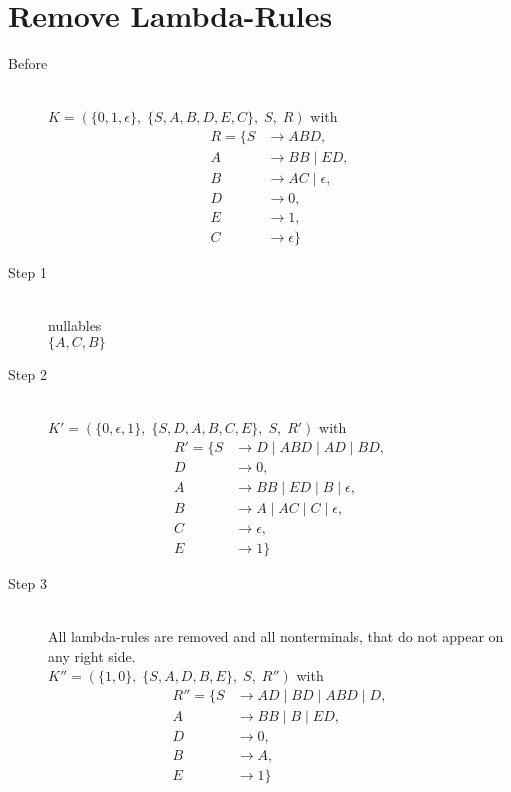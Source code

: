 \documentclass{article}
\begin{document}
\section{Remove Lambda-Rules}

\begin{description}
	\item[Before] \hfill \\ 
		$K=\left(\{	0, 1, \epsilon\},\;\{ S, A, B, D, E, C\},\;S,\;R\right)$ with
	\begin{align*}
		R=\{	S &\rightarrow ABD, \\ 
		A &\rightarrow BB\;|\;ED, \\ 
		B &\rightarrow AC\;|\;\epsilon, \\ 
		D &\rightarrow 0, \\ 
		E &\rightarrow 1, \\ 
		C &\rightarrow \epsilon\}
	\end{align*}
	\item[Step 1] \hfill \\ 
	nullables\\ 
	$\{	A, 	C, 	B\}$
	\item[Step 2] \hfill \\ 
		$K'=\left(\{	0, \epsilon, 1\},\;\{ S, D, A, B, C, E\},\;S,\;R'\right)$ with
	\begin{align*}
		R'=\{	S &\rightarrow D\;|\;ABD\;|\;AD\;|\;BD, \\ 
		D &\rightarrow 0, \\ 
		A &\rightarrow BB\;|\;ED\;|\;B\;|\;\epsilon, \\ 
		B &\rightarrow A\;|\;AC\;|\;C\;|\;\epsilon, \\ 
		C &\rightarrow \epsilon, \\ 
		E &\rightarrow 1\}
	\end{align*}
	\item[Step 3] \hfill \\ 
	All lambda-rules are removed and all nonterminals, that do not appear on any right side.\\ 
	$K''=\left(\{	1, 0\},\;\{ S, A, D, B, E\},\;S,\;R''\right)$ with
	\begin{align*}
		R''=\{	S &\rightarrow AD\;|\;BD\;|\;ABD\;|\;D, \\ 
		A &\rightarrow BB\;|\;B\;|\;ED, \\ 
		D &\rightarrow 0, \\ 
		B &\rightarrow A, \\ 
		E &\rightarrow 1\}
	\end{align*}
\end{description}
\end{document}
